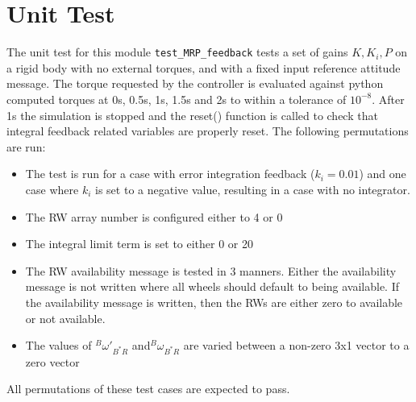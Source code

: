 \documentclass[]{BasiliskReportMemo}
\begin{document}
\section{Unit Test}
The unit test for this module \verb|test_MRP_feedback| tests a set of gains $K,K_i,P$ on a rigid body with no external torques, and with a fixed input reference attitude message. The torque requested by the controller is evaluated against python computed torques at 0s, 0.5s, 1s, 1.5s and 2s to within a tolerance of $10^{-8}$. After 1s the simulation is stopped and the reset() function is called to check that integral feedback related variables are properly reset.  The following permutations are run:
\begin{itemize}
	\item The test is run for a case with error integration feedback ($k_i=0.01$) and one case where $k_i$ is set to a negative value, resulting in a case with no integrator.
	\item The RW array number is configured either to 4 or 0
	\item The integral limit term is set to either 0 or 20
	\item The RW availability message is tested in 3 manners.  Either the availability  message is not written where all wheels should default to being available.  If the availability message is written, then the RWs are either zero to available or not available.
	\item The values of $^B\omega'_{B^*R}$ and$^B\omega_{B^*R}$ are varied between a non-zero 3x1 vector to a zero vector
\end{itemize}
All permutations of these test cases are expected to pass.
\end{document}
